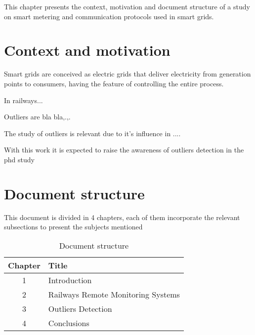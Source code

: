 This chapter presents the context, motivation and document structure of a study on smart metering and communication protocols used in smart grids. 

\section{Context and motivation}

Smart grids are conceived as electric grids that deliver electricity from generation points to consumers, having the feature of controlling the entire process.

In railways...

Outliers are bla bla,.,.

The study of outliers is relevant due to it's influence in ....

With this work it is expected to raise the awareness of outliers detection in the phd study




\section{Document structure}

This document is divided in 4 chapters, each of them incorporate the relevant subsections to present the subjects mentioned

\begin{table}[!h]
    \label{tb:struct}
    \centering
    \caption{Document structure}
    \vspace{0.2em}
    \begin{tabular}{c|l}%
    \textbf{Chapter} & \textbf{Title}                    \\ \hline
    1       &                   Introduction             \\ \hline
    2       &                   Railways Remote Monitoring Systems       \\ \hline
    3       &                   Outliers Detection    \\ \hline
    4       &                   Conclusions               \\
    \end{tabular}
\end{table}